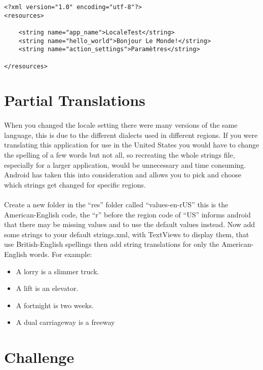 \begin{lstlisting}
<?xml version="1.0" encoding="utf-8"?>
<resources>

    <string name="app_name">LocaleTest</string>
    <string name="hello_world">Bonjour Le Monde!</string>
    <string name="action_settings">Paramètres</string>

</resources>
\end{lstlisting}

\section{Partial Translations}
\paragraph{} When you changed the locale setting there were many versions of the same language, this is due to the different dialects used in different regions. If you were translating this application for use in the United States you would have to change the spelling of a few words but not all, so recreating the whole strings file, especially for a larger application, would be unnecessary and time consuming. Android has taken this into consideration and allows you to pick and choose which strings get changed for specific regions.

\paragraph{} Create a new folder in the “res” folder called “values-en-rUS” this is the American-English code, the ``r'' before the region code of “US” informs android that there may be missing values and to use the default values instead. Now add some strings to your default strings.xml, with TextViews to display them, that use British-English spellings then add string translations for only the American-English words. For example:

\begin{itemize}
\item A lorry is a slimmer truck.
\item A lift is an elevator.
\item A fortnight is two weeks.
\item A dual carriageway is a freeway
\end{itemize}

\section{Challenge}

